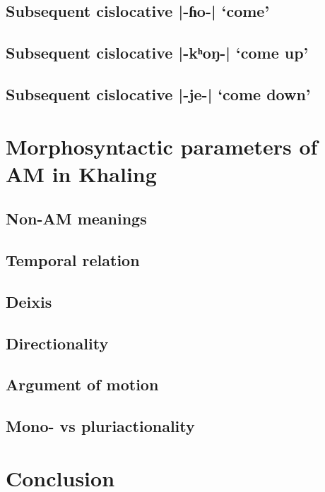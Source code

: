 \documentclass[oneside,a4paper,11pt]{article}
\newcommand{\ipa}[1]{{\phon#1}}
\newcommand{\dhatu}[2]{|\ipa{#1}| `#2'}
\begin{document}
\subsection{Subsequent cislocative \dhatu{-ɦo-}{come}} \label{sec:v2.ho}
\subsection{Subsequent cislocative \dhatu{-kʰoŋ-}{come up}} \label{sec:v2.khoN}
\subsection{Subsequent cislocative \dhatu{-je-}{come down}} \label{sec:v2.je}
\section{Morphosyntactic parameters of AM in Khaling}
\subsection{Non-AM meanings}
\subsection{Temporal relation}
\subsection{Deixis}
\subsection{Directionality}
\subsection{Argument of motion}
\subsection{Mono- vs pluriactionality}

\section{Conclusion}



\end{document}
